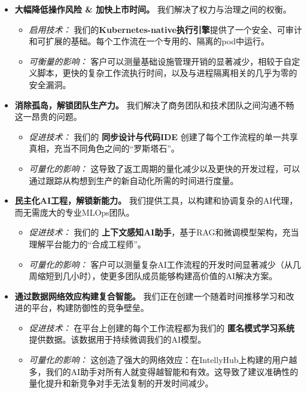 \documentclass[11pt, a4paper, oneside]{article}
\begin{document}
\begin{itemize}
    \item \textbf{大幅降低操作风险 \& 加快上市时间。} 我们解决了权力与治理之间的权衡。
    \begin{itemize}
        \item \textit{启用技术：} 我们的\textbf{Kubernetes-native执行引擎}提供了一个安全、可审计和可扩展的基础。每个工作流在一个专用的、隔离的pod中运行。
        \item \textit{可衡量的影响：} 客户可以测量基础设施管理开销的显著减少，相较于自定义脚本，更快的复杂工作流执行时间，以及与进程隔离相关的几乎为零的安全漏洞。
    \end{itemize}





    \item \textbf{消除孤岛，解锁团队生产力。} 我们解决了商务团队和技术团队之间沟通不畅这一昂贵的问题。
    \begin{itemize}
        \item \textit{促进技术：} 我们的 \textbf{同步设计与代码IDE} 创建了每个工作流程的单一共享真相，充当不同角色之间的“罗斯塔石”。
        \item \textit{可量化的影响：} 这导致了返工周期的量化减少以及更快的开发过程，可以通过跟踪从构想到生产的新自动化所需的时间进行度量。
    \end{itemize}

    \item \textbf{民主化AI工程，解锁新能力。} 我们提供工具，以构建和协调复杂的AI代理，而无需庞大的专业MLOps团队。
    \begin{itemize}
        \item \textit{促进技术：} 我们的 \textbf{上下文感知AI助手}，基于RAG和微调模型架构，充当理解平台能力的“合成工程师”。
        \item \textit{可量化的影响：} 客户可以测量复杂AI工作流程的开发时间显著减少（从几周缩短到几小时），使更多团队成员能够构建高价值的AI解决方案。
    \end{itemize}
        
    \item \textbf{通过数据网络效应构建复合智能。} 我们正在创建一个随着时间推移学习和改进的平台，构建防御性的竞争壁垒。
    \begin{itemize}
        \item \textit{促进技术：} 在平台上创建的每个工作流程都为我们的 \textbf{匿名模式学习系统} 提供数据。该数据用于持续微调我们的AI模型。
        \item \textit{可量化的影响：} 这创造了强大的网络效应：在IntellyHub上构建的用户越多，我们的AI助手对所有人就变得越智能和有效。这导致了建议准确性的量化提升和新竞争对手无法复制的开发时间减少。
    \end{itemize}
\end{itemize}
\end{document}
